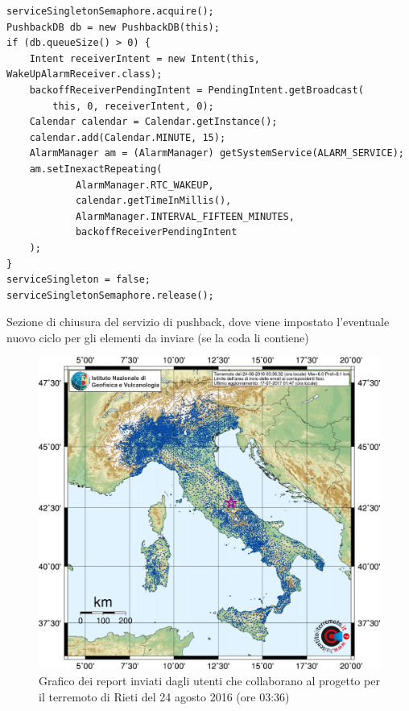 \documentclass[a4paper,10pt]{memoir}
\begin{document}
\begin{listing}[h]
\begin{verbatim}
serviceSingletonSemaphore.acquire();
PushbackDB db = new PushbackDB(this);
if (db.queueSize() > 0) {
	Intent receiverIntent = new Intent(this, WakeUpAlarmReceiver.class);
	backoffReceiverPendingIntent = PendingIntent.getBroadcast(
		this, 0, receiverIntent, 0);
	Calendar calendar = Calendar.getInstance();
	calendar.add(Calendar.MINUTE, 15);
	AlarmManager am = (AlarmManager) getSystemService(ALARM_SERVICE);
	am.setInexactRepeating(
			AlarmManager.RTC_WAKEUP,
			calendar.getTimeInMillis(),
			AlarmManager.INTERVAL_FIFTEEN_MINUTES,
			backoffReceiverPendingIntent
	);
}
serviceSingleton = false;
serviceSingletonSemaphore.release();
\end{verbatim}
\caption{Sezione di chiusura del servizio di pushback, dove viene impostato l'eventuale nuovo ciclo per gli elementi da inviare (se la coda li contiene)}
\label{listing:pushback}
\end{listing}

\begin{figure}[h]
\centering
\caption{Grafico dei report inviati dagli utenti che collaborano al progetto per il terremoto di Rieti del 24 agosto 2016 (ore 03:36)}
\label{fig:hsitmap}
\includegraphics[width=\textwidth]{app/hsit_email}
\end{figure}
\end{document}
